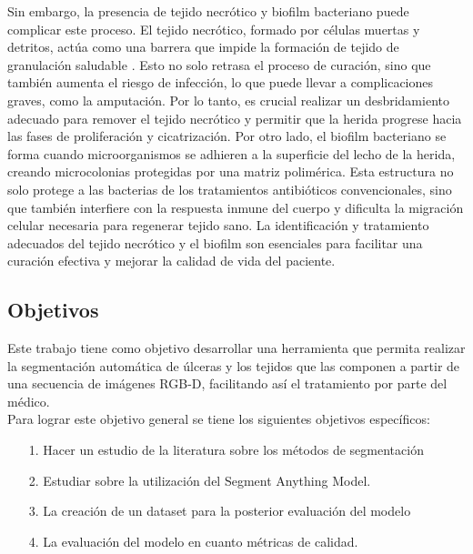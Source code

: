 \documentclass[12pt]{article}
\begin{document}
	Sin embargo, la presencia de tejido necrótico y biofilm bacteriano puede complicar este proceso. El tejido necrótico, formado por células muertas y detritos, actúa como una barrera que impide la formación de tejido de granulación saludable \parencite{Ulceras2024}. Esto no solo retrasa el proceso de curación, sino que también aumenta el riesgo de infección, lo que puede llevar a complicaciones graves, como la amputación. Por lo tanto, es crucial realizar un desbridamiento adecuado para remover el tejido necrótico y permitir que la herida progrese hacia las fases de proliferación y cicatrización.
	Por otro lado, el biofilm bacteriano se forma cuando microorganismos se adhieren a la superficie del lecho de la herida, creando microcolonias protegidas por una matriz polimérica. Esta estructura no solo protege a las bacterias de los tratamientos antibióticos convencionales, sino que también interfiere con la respuesta inmune del cuerpo y dificulta la migración celular necesaria para regenerar tejido sano. La identificación y tratamiento adecuados del tejido necrótico y el biofilm son esenciales para facilitar una curación efectiva y mejorar la calidad de vida del paciente.
	
	\subsection{Objetivos}
	Este trabajo tiene como objetivo desarrollar una herramienta que permita realizar la segmentación automática de úlceras y los tejidos que las componen a partir de una secuencia de imágenes RGB-D, facilitando así el tratamiento por parte del médico.	
	\\
	
	
	Para lograr este objetivo general se tiene los siguientes objetivos espec\'ificos:
	
	\begin{itemize}
		\item[1.] Hacer un estudio de la literatura sobre los m\'etodos de segmentaci\'on
		\item[2.] Estudiar sobre la utilizaci\'on del Segment Anything Model.
		\item[3.] La creaci\'on de un dataset para la posterior evaluaci\'on del modelo
		\item[4.] La evaluaci\'on del modelo en cuanto m\'etricas de calidad. 
	\end{itemize}
	
\end{document}
